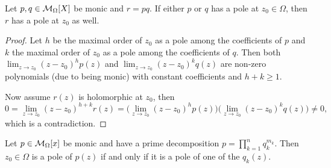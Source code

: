 \begin{lemma} \label{polesProductPolynomial}
Let $p,q\in \operatorname{\mathcal{M}}_\Omega[X]$ be monic and $r = pq$. If either $p$ or $q$ has a pole at $z_0\in \Omega$, then $r$ has a pole at $z_0$ as well.
\end{lemma}
\begin{proof}
Let $h$ be the maximal order of $z_0$ as a pole among the coefficients of $p$ and $k$ the maximal order of $z_0$ as a pole among the coefficients of $q$. Then both $\lim_{z\to z_0}(z-z_0)^h p(z)$ and $\lim_{z\to z_0}(z-z_0)^k q(z)$ are non-zero polynomials (due to being monic) with constant coefficients and $h+k \geq 1$. 

Now assume $r(z)$ is holomorphic at $z_0$, then
\[ 0 = \lim_{z\to z_0}(z-z_0)^{h+k}r(z) = \Big(\lim_{z\to z_0}(z-z_0)^h p(z)\Big)\Big(\lim_{z\to z_0}(z-z_0)^k q(z)\Big) \neq 0, \]
which is a contradiction.
\end{proof}
\begin{corollary}
Let $p \in \operatorname{\mathcal{M}}_\Omega[x]$ be monic and have a prime decomposition $p = \prod_{k=1}^nq_k^{m_k}$. Then $z_0\in \Omega$ is a pole of $p(z)$ \textup{if and only if} it is a pole of one of the $q_k(z)$.
\end{corollary}

